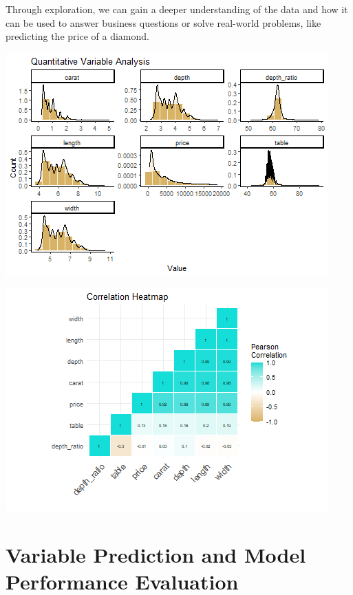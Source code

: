 \documentclass[
  paper=a4,
  ,captions=tableheading
]{scrartcl}
\begin{document}
Through exploration, we can gain a deeper understanding of the data and
how it can be used to answer business questions or solve real-world
problems, like predicting the price of a diamond.

\begin{center}\includegraphics{Diamonds_PDF_files/figure-latex/Histograms-1} \end{center}

\begin{center}\includegraphics{Diamonds_PDF_files/figure-latex/Correlation-1} \end{center}

\hypertarget{variable-prediction-and-model-performance-evaluation}{%
\section{Variable Prediction and Model Performance
Evaluation}\label{variable-prediction-and-model-performance-evaluation}}
\end{document}
